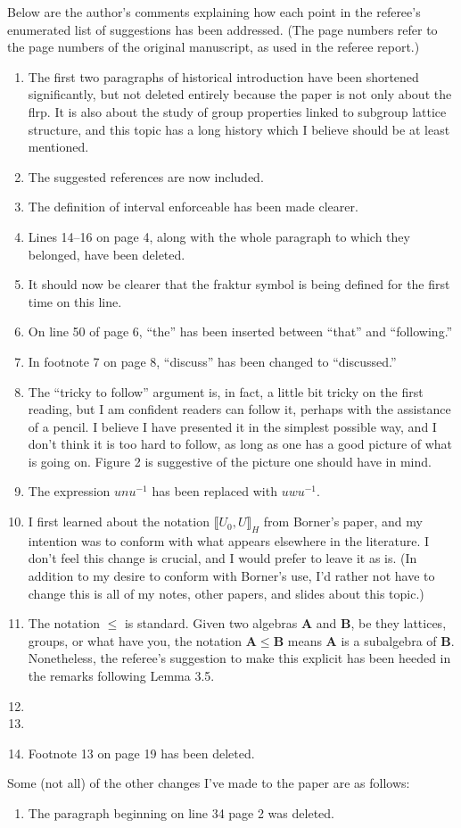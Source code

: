 \documentclass{article}
\newcommand{\bB}{{\mathbf{B}}}
\newcommand{\bA}{\ensuremath{\mathbf{A}}}
\newcommand{\lb}{\ensuremath{\llbracket}}
\newcommand{\rb}{\ensuremath{\rrbracket}}
\begin{document}
\vskip1cm
Below are the author's comments explaining how each point in the referee's
enumerated list of suggestions has been addressed.  (The page numbers refer
to the page numbers of the original manuscript, as used in the referee report.)
\begin{enumerate}[(1)]
\item The first two paragraphs of historical introduction have been
  shortened significantly, but not deleted entirely because the paper is not
  only about the \acs{flrp}.  It is also about the study of group properties
  linked to subgroup lattice structure, and this topic has a long history which
  I believe should be at least mentioned.
\item The suggested references are now included.
\item The definition of interval enforceable has been made clearer.
\item Lines 14--16 on page 4, along with the whole paragraph to which they
  belonged, have been deleted.
\item It should now be clearer that the fraktur symbol is being defined for the first
  time on this line.
\item On line 50 of page 6, ``the'' has been inserted between ``that'' and
  ``following.''
\item In footnote 7 on page 8, ``discuss'' has been changed to ``discussed.''
\item The ``tricky to follow'' argument is, in fact, a little bit tricky on the 
  first reading, but I am confident readers can follow it, perhaps with the
  assistance of a pencil.  I believe I have presented it in the simplest
  possible way, and I don't think it is too hard to follow, as long as
  one has a good picture of what is going on. Figure 2 is suggestive of the
  picture one should have in mind.
\item The expression $unu^{-1}$ has been replaced with $uwu^{-1}$.
\item I first learned about the notation $\lb U_0, U \rb_H$ from Borner's paper,
  and my intention was to conform with what appears elsewhere in the literature. I
  don't feel this change is crucial, and I would prefer to leave it as is.
  (In addition to my desire to conform with Borner's use, I'd rather not 
  have to change this is all of my notes, other papers, and slides about this
  topic.) 
\item The notation $\leq$ is standard. Given two algebras
  $\bA$ and $\bB$, be they lattices, groups, or what have you, the notation $\bA
  \leq \bB$ means $\bA$ is a subalgebra of $\bB$. Nonetheless, the referee's
  suggestion to make this explicit has been heeded in the remarks following
  Lemma 3.5. 
\item  
\item
\item Footnote 13 on page 19 has been deleted.

\end{enumerate}

\vskip1cm
Some (not all) of the other changes I've made to the paper are as follows:
\begin{enumerate}[(1)]
\item 
The paragraph beginning on line 34 page 2 was deleted.
\end{enumerate}
\end{document}
